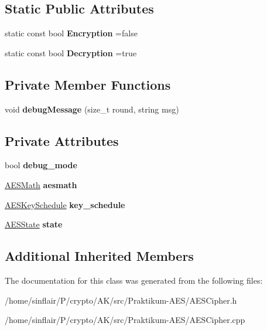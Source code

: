 \subsection*{Static Public Attributes}
\begin{DoxyCompactItemize}
\item 
\mbox{\label{classAESCipher_af100a312dbbee903a9500a87e72895a6}} 
static const bool {\bfseries Encryption} =false
\item 
\mbox{\label{classAESCipher_a61687ed03866ee1a8b6dd42a460fec9c}} 
static const bool {\bfseries Decryption} =true
\end{DoxyCompactItemize}
\subsection*{Private Member Functions}
\begin{DoxyCompactItemize}
\item 
\mbox{\label{classAESCipher_ae58dc19b08c7c70a4d078714cecab9b1}} 
void {\bfseries debug\+Message} (size\+\_\+t round, string msg)
\end{DoxyCompactItemize}
\subsection*{Private Attributes}
\begin{DoxyCompactItemize}
\item 
\mbox{\label{classAESCipher_a6809a0219f4fb1b4f36ab094a1da9d89}} 
bool {\bfseries debug\+\_\+mode}
\item 
\mbox{\label{classAESCipher_a968741a17b9fdc692454b10b39dc104e}} 
\hyperlink{classAESMath}{A\+E\+S\+Math} {\bfseries aesmath}
\item 
\mbox{\label{classAESCipher_afb744a0b2530339e42d3e0c14a75d3a9}} 
\hyperlink{classAESKeySchedule}{A\+E\+S\+Key\+Schedule} {\bfseries key\+\_\+schedule}
\item 
\mbox{\label{classAESCipher_a63a10fb1c42ee469700e57df0618262d}} 
\hyperlink{classAESState}{A\+E\+S\+State} {\bfseries state}
\end{DoxyCompactItemize}
\subsection*{Additional Inherited Members}


The documentation for this class was generated from the following files\+:\begin{DoxyCompactItemize}
\item 
/home/sinflair/\+P/crypto/\+A\+K/src/\+Praktikum-\/\+A\+E\+S/A\+E\+S\+Cipher.\+h\item 
/home/sinflair/\+P/crypto/\+A\+K/src/\+Praktikum-\/\+A\+E\+S/A\+E\+S\+Cipher.\+cpp\end{DoxyCompactItemize}
